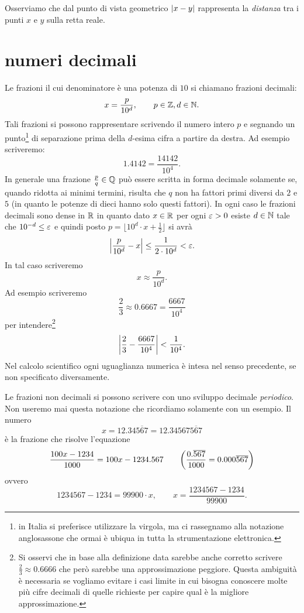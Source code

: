 Osserviamo che dal punto di vista geometrico
${\left|x-y\right|}$ rappresenta la \emph{distanza} tra i punti
$x$ e $y$ sulla retta reale.

\section{numeri decimali}
%
Le frazioni il cui denominatore è una potenza
di $10$ si chiamano frazioni decimali:
\[
  x = \frac{p}{10^d}, \qquad p\in \mathbb Z, d\in \mathbb N.
\]
Tali frazioni si possono rappresentare
scrivendo il numero
intero $p$ e segnando un punto\footnote{%
in Italia si preferisce utilizzare la virgola, ma
ci rassegnamo alla notazione anglosassone che ormai è
ubiqua in tutta la strumentazione elettronica.
}
di separazione
prima della $d$-esima cifra a partire da destra.
Ad esempio scriveremo:
\[
  1.4142 = \frac{14142}{10^4}.
\]
In generale una frazione $\frac{p}{q}\in \mathbb Q$
può essere scritta in forma decimale solamente
se, quando ridotta ai minimi termini,
risulta che $q$ non ha fattori primi diversi
da $2$ e $5$ (in quanto le potenze di dieci
hanno solo questi fattori).
In ogni caso le frazioni decimali sono dense in $\mathbb R$
in quanto dato $x\in \mathbb R$ per ogni $\varepsilon>0$ esiste
$d\in \mathbb N$ tale che $10^{-d}\le\varepsilon$ e quindi
posto $p=\lfloor 10^d\cdot x + \frac 1 2\rfloor$
si avrà
\[
    {\left|\frac{p}{10^d} - x\right|} \le \frac{1}{2\cdot 10^d} < \varepsilon.
\]
In tal caso scriveremo
\mymargin{$\approx$}
\[
  x \approx \frac{p}{10^d}.
\]
Ad esempio scriveremo
\[
  \frac 2 3 \approx 0.6667 = \frac{6667}{10^4}
\]
per intendere\footnote{%
Si osservi che in base alla definizione data sarebbe anche corretto 
scrivere $\frac 2 3 \approx 0.6666$ che però sarebbe una approssimazione 
peggiore. 
Questa ambiguità è necessaria se vogliamo evitare i casi 
limite in cui bisogna conoscere molte più cifre decimali di quelle richieste 
per capire qual è la migliore approssimazione.
}
\begin{equation}\label{eq:approx_23}
{\left|\frac 2 3 - \frac{6667}{10^4}\right|}<\frac{1}{10^4}.
\end{equation}
Nel calcolo scientifico ogni uguaglianza numerica è intesa nel 
senso precedente, se non specificato diversamente. 

Le frazioni non decimali si possono scrivere con uno sviluppo
decimale \emph{periodico}. 
Non useremo mai questa notazione
che ricordiamo solamente con un esempio.
Il numero
\[
  x = 12.34\overline{567}
    = 12.34567\overline{567}
\]
è la frazione che risolve l'equazione
\[
  \frac{100x - 1234}{1000}
  = 100x-1234.567
  \qquad
{\left( \frac{0.\overline{567}}{1000}
= 0.000\overline{567}  \right)}
\]
ovvero
\[
  1234567 - 1234 = 99900 \cdot x,
  \qquad x = \frac{1234567-1234}{99900}.
\]

